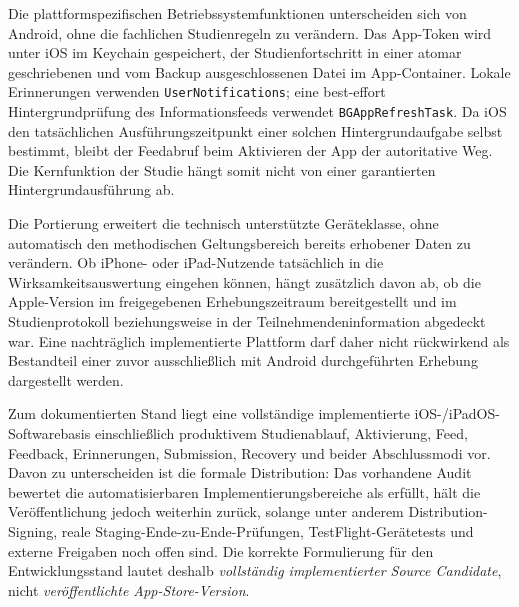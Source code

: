 \begin{neu}
Die plattformspezifischen Betriebssystemfunktionen unterscheiden sich von Android, ohne die fachlichen Studienregeln zu verändern. Das App-Token wird unter iOS im Keychain gespeichert, der Studienfortschritt in einer atomar geschriebenen und vom Backup ausgeschlossenen Datei im App-Container. Lokale Erinnerungen verwenden \texttt{UserNotifications}; eine best-effort Hintergrundprüfung des Informationsfeeds verwendet \texttt{BGAppRefreshTask}. Da iOS den tatsächlichen Ausführungszeitpunkt einer solchen Hintergrundaufgabe selbst bestimmt, bleibt der Feedabruf beim Aktivieren der App der autoritative Weg. Die Kernfunktion der Studie hängt somit nicht von einer garantierten Hintergrundausführung ab.

Die Portierung erweitert die technisch unterstützte Geräteklasse, ohne automatisch den methodischen Geltungsbereich bereits erhobener Daten zu verändern. Ob iPhone- oder iPad-Nutzende tatsächlich in die Wirksamkeitsauswertung eingehen können, hängt zusätzlich davon ab, ob die Apple-Version im freigegebenen Erhebungszeitraum bereitgestellt und im Studienprotokoll beziehungsweise in der Teilnehmendeninformation abgedeckt war. Eine nachträglich implementierte Plattform darf daher nicht rückwirkend als Bestandteil einer zuvor ausschließlich mit Android durchgeführten Erhebung dargestellt werden.

Zum dokumentierten Stand liegt eine vollständige implementierte iOS-/iPadOS-Softwarebasis einschließlich produktivem Studienablauf, Aktivierung, Feed, Feedback, Erinnerungen, Submission, Recovery und beider Abschlussmodi vor. Davon zu unterscheiden ist die formale Distribution: Das vorhandene Audit bewertet die automatisierbaren Implementierungsbereiche als erfüllt, hält die Veröffentlichung jedoch weiterhin zurück, solange unter anderem Distribution-Signing, reale Staging-Ende-zu-Ende-Prüfungen, TestFlight-Gerätetests und externe Freigaben noch offen sind. Die korrekte Formulierung für den Entwicklungsstand lautet deshalb \emph{vollständig implementierter Source Candidate}, nicht \emph{veröffentlichte App-Store-Version}.
\end{neu}
